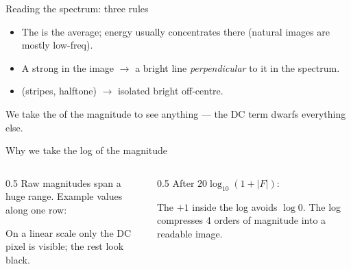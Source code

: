 \documentclass[10pt,aspectratio=169]{beamer}
\begin{document}
\begin{frame}{Reading the spectrum: three rules}
  \begin{itemize}
    \item The  is the average; energy usually concentrates there (natural images are mostly low-freq).
    \item A strong  in the image $\rightarrow$ a bright line \emph{perpendicular} to it in the spectrum.
    \item {} (stripes, halftone) $\rightarrow$ isolated bright  off-centre.
  \end{itemize}
  \begin{infobox}
    We take the  of the magnitude to see anything — the DC term dwarfs everything else.
  \end{infobox}
\end{frame}

\begin{frame}{Why we take the log of the magnitude}
  \begin{columns}[T]
    \begin{column}{0.5\textwidth}
      Raw magnitudes span a huge range. Example values along one row:
      \begin{center}\end{center}
      On a linear scale only the DC pixel is visible; the rest look black.
    \end{column}
    \begin{column}{0.5\textwidth}
      After $20\log_{10}(1+|F|)$:
      \begin{center}\end{center}
      \begin{goodbox}
        The $+1$ inside the log avoids $\log 0$. The log compresses 4 orders of magnitude into a
        readable image.
      \end{goodbox}
    \end{column}
  \end{columns}
\end{frame}
\end{document}
